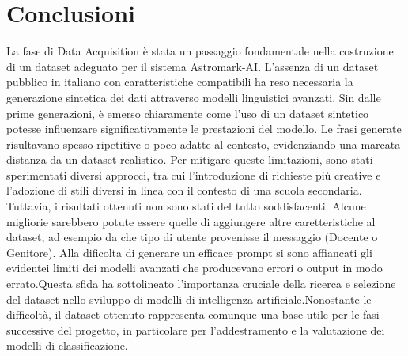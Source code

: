 \section{Conclusioni}
La fase di Data Acquisition è stata un passaggio fondamentale nella costruzione di un dataset adeguato per il sistema Astromark-AI. L’assenza di un dataset pubblico in italiano con caratteristiche compatibili ha reso necessaria la generazione sintetica dei dati attraverso modelli linguistici avanzati. Sin dalle prime generazioni, è emerso chiaramente come l’uso di un dataset sintetico potesse influenzare significativamente le prestazioni del modello. Le frasi generate risultavano spesso ripetitive o poco adatte al contesto, evidenziando una marcata distanza da un dataset realistico. Per mitigare queste limitazioni, sono stati sperimentati diversi approcci, tra cui l’introduzione di richieste più creative e l’adozione di stili diversi in linea con il contesto di una scuola secondaria. Tuttavia, i risultati ottenuti non sono stati del tutto soddisfacenti. Alcune migliorie sarebbero potute essere quelle di aggiungere altre caretteristiche al dataset, ad esempio da che tipo di utente provenisse il messaggio (Docente o Genitore). Alla dificolta di generare un efficace prompt si sono affiancati gli evidentei limiti dei modelli avanzati che producevano errori o output in modo errato.Questa sfida ha sottolineato l’importanza cruciale della ricerca e selezione del dataset nello sviluppo di modelli di intelligenza artificiale.Nonostante le difficoltà, il dataset ottenuto rappresenta comunque una base utile per le fasi successive del progetto, in particolare per l'addestramento e la valutazione dei modelli di classificazione.

